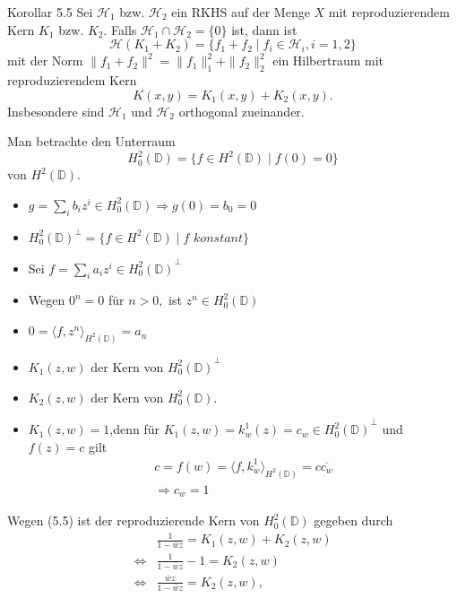 \documentclass{beamer}
\begin{document}
\begin{frame}
\begin{block}{Korollar 5.5}
Sei $\mathcal{H}_1$ bzw. $\mathcal{H}_2$ ein RKHS auf der Menge $X$ mit reproduzierendem Kern $K_1$ bzw. $K_2$. Falls $\mathcal{H}_1 \cap \mathcal{H}_2=\{0\}$ ist, dann ist 
\[
\mathcal{H}(K_1+K_2)=\{f_1+f_2\mid f_i\in \mathcal{H}_i,i=1,2\}
\] 
mit der Norm $\|f_1+f_2\|^2=\|f_1\|^2_1+\|f_2\|^2_2$
ein Hilbertraum mit reproduzierendem Kern
\[
K(x,y)=K_1(x,y)+K_2(x,y).
\]
Insbesondere sind $\mathcal{H}_1$ und $\mathcal{H}_2$ orthogonal zueinander.
\end{block}
\end{frame}

\begin{frame}
Man betrachte den Unterraum
\[
H^2_0(\mathbb{D})=\{f\in H^2(\mathbb{D})\mid f(0)=0\}
\] von $H^2(\mathbb{D}).$
\begin{itemize}
\item $g=\sum_i b_iz^i\in H^2_0(\mathbb{D})\Rightarrow g(0)=b_0=0$\pause
\item $H^2_0(\mathbb{D})^{\bot}=\{f\in H^2(\mathbb{D})\mid f\,\, konstant\}$
\end{itemize}
\end{frame}

\begin{frame}
\begin{itemize}
\item Sei $f=\sum_ia_iz^i\in {H_0^2(\mathbb{D})}^{\bot}$ 
\pause
\item Wegen $0^n=0$ für $n>0,$ ist $z^n\in H^2_0(\mathbb{D})$ 
\pause
\item  $0=\langle f,z^n\rangle_{H^2(\mathbb{D})}=a_n$\\ 
\end{itemize}
\end{frame}
\begin{frame}
\begin{itemize}
\item $K_1(z,w)$ der Kern von ${H_0^2(\mathbb{D})}^{\bot}$\pause
 \item $K_2(z,w)$  der Kern von ${H_0^2(\mathbb{D})}.$
\pause
\item $K_1(z,w)=1$,\pause denn für $K_1(z,w)=k^1_w(z)=c_w\in {H_0^2(\mathbb{D})}^{\bot}$ und $f(z)=c$ gilt \pause
\begin{align*}
c=f(w)=\langle f,k^1_w\rangle_{H^2(\mathbb{D})}=c\overline{c_w}\\
\Rightarrow c_w=1
\end{align*}
\end{itemize}
\end{frame}
\begin{frame}
Wegen (5.5) ist der reproduzierende Kern von $H^2_0(\mathbb{D})$ gegeben durch\pause
\begin{align*}
&\frac{1}{1-\bar{w}z}=K_1(z,w)+K_2(z,w)\\ 
\Leftrightarrow&\frac{1}{1-\bar{w}z}-1=K_2(z,w)\\
\Leftrightarrow&\frac{\bar{w}z}{1-\bar{w}z}=K_2(z,w),\\
\end{align*}
\end{frame}
\end{document}
